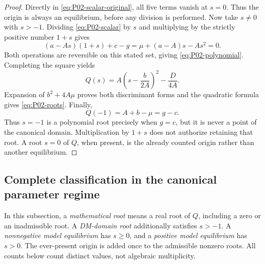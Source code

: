 \documentclass[11pt]{article}
\theoremstyle{definition}
\theoremstyle{remark}
\begin{document}
\begin{proof}
Directly in \eqref{eq:P02-scalar-original}, all five terms vanish
at $s=0$. Thus the origin is always an equilibrium, before any
division is performed. Now take $s\ne0$ with $s>-1$.
Dividing \eqref{eq:P02-scalar} by $s$ and multiplying by
the strictly positive number $1+s$ gives
\[
 (a-As)(1+s)+c-g=\mu+(a-A)s-As^2=0.
\]
Both operations are reversible on this stated set, giving
\eqref{eq:P02-polynomial}. Completing the square yields
\begin{equation}
\label{eq:P02-square}
 Q(s)=A\left(s-\frac b{2A}\right)^2-\frac D{4A}.
\end{equation}
Expansion of $b^2+4A\mu$ proves both discriminant forms and the
quadratic formula gives \eqref{eq:P02-roots}. Finally,
\begin{equation}
\label{eq:P02-minusone}
 Q(-1)=A+b-\mu=g-c.
\end{equation}
Thus $s=-1$ is a polynomial root precisely when $g=c$, but it is
never a point of the canonical domain. Multiplication by $1+s$
does not authorize retaining that root. A root $s=0$ of $Q$, when
present, is the already counted origin rather than another equilibrium.
\end{proof}

\subsection{Complete classification in the canonical parameter regime}
\label{slot:P02-3}

In this subsection, a \emph{mathematical root} means a real root of
$Q$, including a zero or an inadmissible root. A \emph{DM-domain root}
additionally satisfies $s>-1$. A \emph{nonnegative model equilibrium}
has $s\ge0$, and a \emph{positive model equilibrium} has $s>0$.
The ever-present origin is added once to the admissible nonzero roots.
All counts below count distinct values, not algebraic multiplicity.
\end{document}
